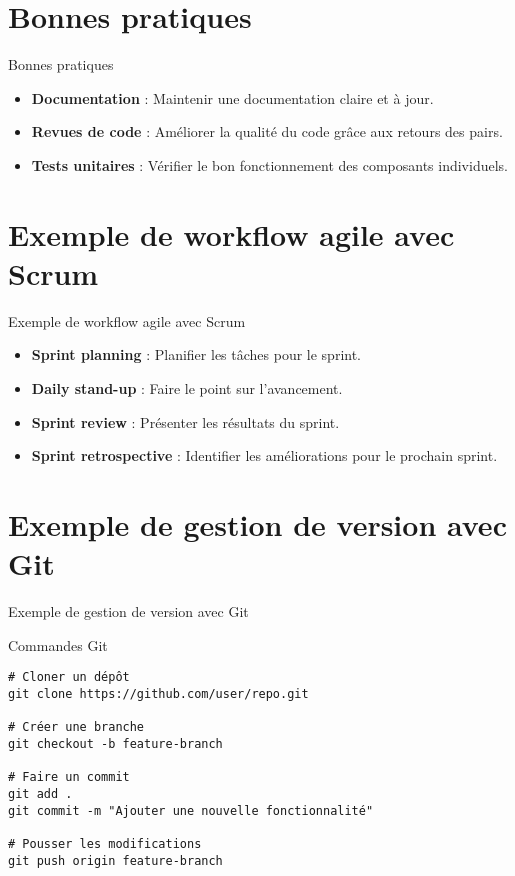\documentclass{clbeamer2024}
\begin{document}
	\section{Bonnes pratiques}
	\begin{frame}{Bonnes pratiques}
		\begin{itemize}
			\item \textbf{Documentation} : Maintenir une documentation claire et à jour.
			\item \textbf{Revues de code} : Améliorer la qualité du code grâce aux retours des pairs.
			\item \textbf{Tests unitaires} : Vérifier le bon fonctionnement des composants individuels.
		\end{itemize}
	\end{frame}
	
	\section{Exemple de workflow agile avec Scrum}
	\begin{frame}{Exemple de workflow agile avec Scrum}
		\begin{itemize}
			\item \textbf{Sprint planning} : Planifier les tâches pour le sprint.
			\item \textbf{Daily stand-up} : Faire le point sur l'avancement.
			\item \textbf{Sprint review} : Présenter les résultats du sprint.
			\item \textbf{Sprint retrospective} : Identifier les améliorations pour le prochain sprint.
		\end{itemize}
	\end{frame}
	
	
	\section{Exemple de gestion de version avec Git}
	\begin{frame}[fragile]{Exemple de gestion de version avec Git}
		\begin{exampleblock}{Commandes Git}
			\begin{verbatim}
# Cloner un dépôt
git clone https://github.com/user/repo.git
				
# Créer une branche
git checkout -b feature-branch
				
# Faire un commit
git add .
git commit -m "Ajouter une nouvelle fonctionnalité"
				
# Pousser les modifications
git push origin feature-branch
			\end{verbatim}
		\end{exampleblock}
	\end{frame}
	
\end{document}
